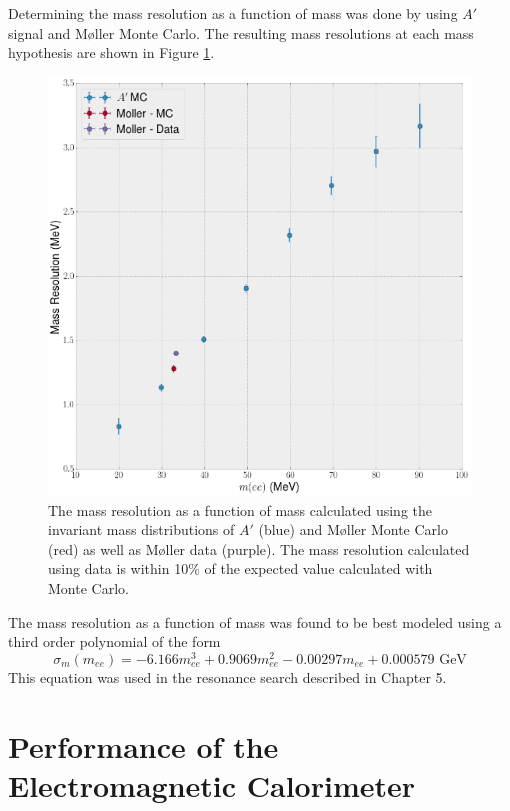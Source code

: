 Determining the mass resolution as a function of mass was done by using $A'$ 
signal and M\o ller Monte Carlo. The resulting mass resolutions at each mass 
hypothesis are shown in Figure \ref{fig:mass_resolution}. 
\begin{figure}[h!t]
    \centering
    \includegraphics[width=.8\textwidth]{images/invariant_mass_curve.png}
    \caption{The mass resolution as a function of mass calculated using 
              the invariant mass distributions of
              $A'$ (blue) and M\o ller Monte Carlo (red) as well as M\o ller 
         data (purple).  The mass resolution calculated using data is within
            10\% of the expected value calculated with Monte Carlo.}
    \label{fig:mass_resolution}
\end{figure}
The mass resolution as a function of mass was found to be best modeled using
a third order polynomial of the form
\begin{equation}
    \sigma_{m}(m_{ee}) = -6.166 m_{ee}^3 + 0.9069 m_{ee}^2 - 0.00297 m_{ee} + 0.000579 \text{ GeV}
\end{equation}
This equation was used in the resonance search described in Chapter 5. 

\section{Performance of the Electromagnetic Calorimeter}

